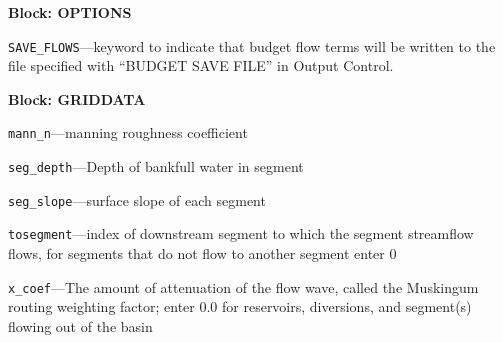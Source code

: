 
\item \textbf{Block: OPTIONS}

\begin{description}
\item \texttt{SAVE\_FLOWS}---keyword to indicate that budget flow terms will be written to the file specified with ``BUDGET SAVE FILE'' in Output Control.

\end{description}
\item \textbf{Block: GRIDDATA}

\begin{description}
\item \texttt{mann\_n}---manning roughness coefficient

\item \texttt{seg\_depth}---Depth of bankfull water in segment

\item \texttt{seg\_slope}---surface slope of each segment

\item \texttt{tosegment}---index of downstream segment to which the segment streamflow flows, for segments that do not flow to another segment enter 0

\item \texttt{x\_coef}---The amount of attenuation of the flow wave, called the Muskingum routing weighting factor; enter 0.0 for reservoirs, diversions, and segment(s) flowing out of the basin

\end{description}

